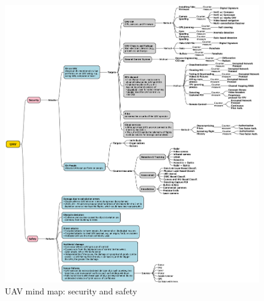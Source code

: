 \begin{figure}[!hbt]
  \centering
  \includegraphics[width=1.0\textwidth]{./img/eps/uav3-mindmap.eps} 
%   
  \caption{UAV mind map: security and safety}%
  \label{fig:uav-security-mindmap}
\end{figure}

